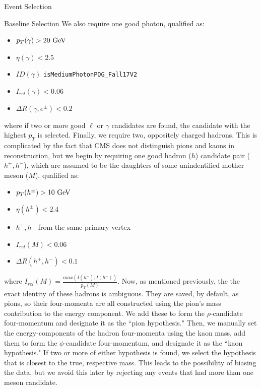 \begin{section}{Event Selection}
\begin{subsection}{Baseline Selection}
\noindent We also require one good photon, qualified as:
\begin{itemize}
    \item $p_{T}(\gamma) > 20\textnormal{ GeV}$
    \item $\eta(\gamma) < 2.5$
    \item $ID(\gamma)$ \verb|isMediumPhotonPOG_Fall17V2|
    \item $I_{rel}(\gamma) < 0.06$
    \item $\Delta R(\gamma, e^{\pm}) < 0.2$
\end{itemize}
\noindent where if two or more good $\ell$ or $\gamma$ candidates are found, the candidate with the highest $p_{T}$ is selected. Finally, we require two, oppositely charged hadrons. This is complicated by the fact that CMS does not distinguish pions and kaons in reconstruction, but we begin by requiring one good hadron ($h$) candidate pair ($h^{+}, h^{-}$), which are assumed to be the daughters of some unindentified mother meson ($M$), qualified as:
\begin{itemize}
    \item $p_{T}(h^{\pm}) > 10\textnormal{ GeV}$
    \item $\eta(h^{\pm}) < 2.4$
    \item $h^{+}, h^{-}$ from the same primary vertex
    \item $I_{rel}(M) < 0.06$
    \item $\Delta R(h^{+}, h^{-}) < 0.1$
\end{itemize}
\noindent where $I_{rel}(M) = \frac{max(I(h^{+}), I(h^{-}))}{p_{T}(M)}$. Now, as mentioned previously, the the exact identity of these hadrons is ambiguous. They are saved, by default, as pions, so their four-momenta are all constructed using the pion's mass contribution to the energy component. We add these to form the $\rho$-candidate four-momentum and designate it as the ``pion hypothesis." Then, we manually set the energy-components of the hadron four-momenta using the kaon mass, add them to form the $\phi$-candidate four-momentum, and designate it as the ``kaon hypothesis." If two or more of either hypothesis is found, we select the hypothesis that is closest to the true, respective mass. This leads to the possibility of biasing the data, but we avoid this later by rejecting any events that had more than one meson candidate.
\end{subsection}
\end{section}

